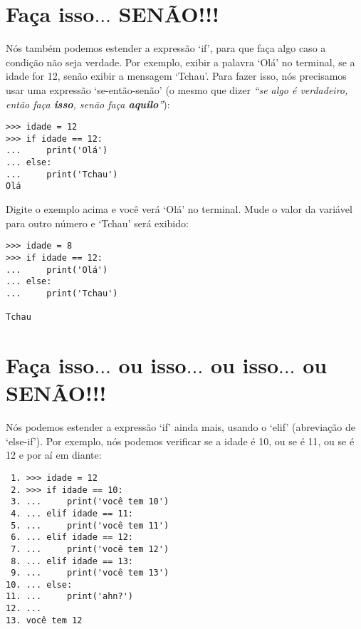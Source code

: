\section{Faça isso$\ldots$ SENÃO!!!}

Nós também podemos estender a expressão `if', para que faça algo caso a condição não seja verdade. Por exemplo, exibir a palavra `Olá' no terminal, se a idade for 12, senão exibir a mensagem `Tchau'. Para fazer isso, nós precisamos usar uma expressão `se-então-senão' (o mesmo que dizer \emph{``se algo é verdadeiro, então faça \textbf{isso}, senão faça \textbf{aquilo}''}):

\begin{listing}
\begin{verbatim}
>>> idade = 12
>>> if idade == 12:
...     print('Olá')
... else:
...     print('Tchau')
Olá
\end{verbatim}
\end{listing}

Digite o exemplo acima e você verá `Olá' no terminal. Mude o valor da variável  para outro número e `Tchau' será exibido:

\begin{listing}
\begin{verbatim}
>>> idade = 8
>>> if idade == 12:
...     print('Olá')
... else:
...     print('Tchau')

Tchau
\end{verbatim}
\end{listing}

\section{Faça isso$\ldots$ ou isso$\ldots$ ou isso$\ldots$ ou SENÃO!!!}

Nós podemos estender a expressão `if' ainda mais, usando o `elif' (abreviação de `else-if'). Por exemplo, nós podemos verificar se a idade é 10, ou se é 11, ou se é 12 e por aí em diante:

\begin{listing}
\begin{verbatim}
 1. >>> idade = 12
 2. >>> if idade == 10:
 3. ...     print('você tem 10')
 4. ... elif idade == 11:
 5. ...     print('você tem 11')
 6. ... elif idade == 12:
 7. ...     print('você tem 12')
 8. ... elif idade == 13:
 9. ...     print('você tem 13')
10. ... else:
11. ...     print('ahn?')
12. ...
13. você tem 12
\end{verbatim}
\end{listing}

